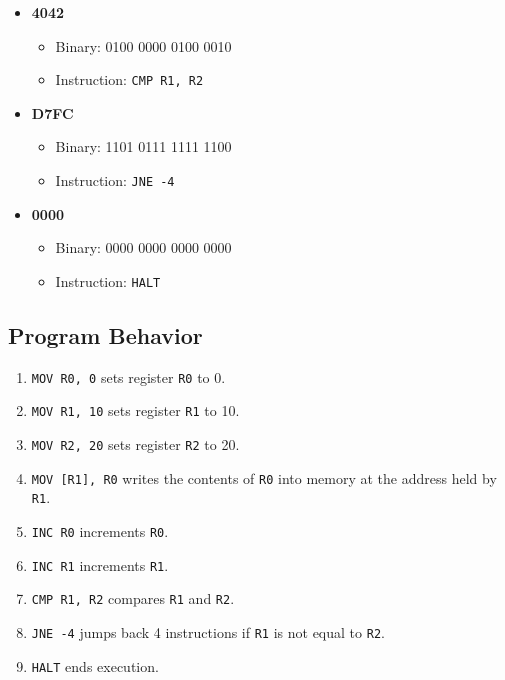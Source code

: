 \documentclass{report}
\begin{document}
\begin{itemize}
	\item \textbf{4042}
	      \begin{itemize}
		      \item Binary: 0100 0000 0100 0010
		      \item Instruction: \texttt{CMP R1, R2}
	      \end{itemize}

	\item \textbf{D7FC}
	      \begin{itemize}
		      \item Binary: 1101 0111 1111 1100
		      \item Instruction: \texttt{JNE -4}
	      \end{itemize}

	\item \textbf{0000}
	      \begin{itemize}
		      \item Binary: 0000 0000 0000 0000
		      \item Instruction: \texttt{HALT}
	      \end{itemize}
\end{itemize}

\subsection{Program Behavior}
\begin{enumerate}
	\item \texttt{MOV R0, 0} sets register \texttt{R0} to 0.
	\item \texttt{MOV R1, 10} sets register \texttt{R1} to 10.
	\item \texttt{MOV R2, 20} sets register \texttt{R2} to 20.
	\item \texttt{MOV [R1], R0} writes the contents of \texttt{R0} into memory at the address held by \texttt{R1}.
	\item \texttt{INC R0} increments \texttt{R0}.
	\item \texttt{INC R1} increments \texttt{R1}.
	\item \texttt{CMP R1, R2} compares \texttt{R1} and \texttt{R2}.
	\item \texttt{JNE -4} jumps back 4 instructions if \texttt{R1} is not equal to \texttt{R2}.
	\item \texttt{HALT} ends execution.
\end{enumerate}
\end{document}
